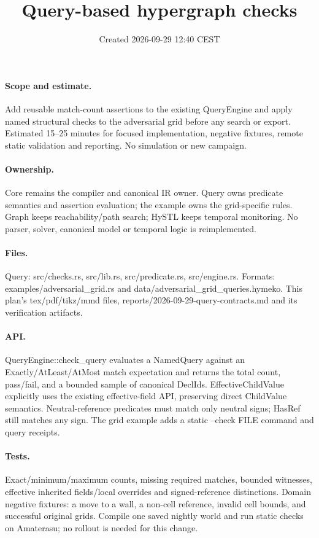 \documentclass[11pt,a4paper]{article}
\title{Query-based hypergraph checks}
\date{Created 2026-09-29 12:40 CEST}
\begin{document}
\maketitle
\paragraph{Scope and estimate.} Add reusable match-count assertions to the existing
QueryEngine and apply named structural checks to the adversarial grid before any
search or export. Estimated 15--25 minutes for focused implementation, negative
fixtures, remote static validation and reporting. No simulation or new campaign.
\paragraph{Ownership.} Core remains the compiler and canonical IR owner. Query owns
predicate semantics and assertion evaluation; the example owns the grid-specific
rules. Graph keeps reachability/path search; HySTL keeps temporal monitoring.
No parser, solver, canonical model or temporal logic is reimplemented.
\paragraph{Files.} Query: src/checks.rs, src/lib.rs, src/predicate.rs,
src/engine.rs. Formats: examples/adversarial\_grid.rs and
data/adversarial\_grid\_queries.hymeko. This plan's tex/pdf/tikz/mmd files,
reports/2026-09-29-query-contracts.md and its verification artifacts.
\paragraph{API.} QueryEngine::check\_query evaluates a NamedQuery against an
Exactly/AtLeast/AtMost match expectation and returns the total count, pass/fail,
and a bounded sample of canonical DeclIds. EffectiveChildValue explicitly uses
the existing effective-field API, preserving direct ChildValue semantics.
Neutral-reference predicates must match only neutral signs; HasRef still matches
any sign. The grid example adds a static --check FILE command and query receipts.
\paragraph{Tests.} Exact/minimum/maximum counts, missing required matches, bounded
witnesses, effective inherited fields/local overrides and signed-reference
distinctions. Domain negative fixtures: a move to a wall, a non-cell reference,
invalid cell bounds, and successful original grids. Compile one saved nightly
world and run static checks on Amaterasu; no rollout is needed for this change.
\end{document}
